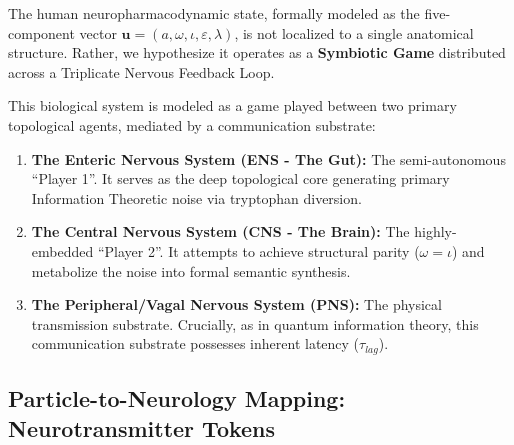 The human neuropharmacodynamic state, formally modeled as the five-component vector $\mathbf{u} = (a, \omega, \iota, \varepsilon, \lambda)$, is not localized to a single anatomical structure. Rather, we hypothesize it operates as a \textbf{Symbiotic Game} distributed across a Triplicate Nervous Feedback Loop.

This biological system is modeled as a game played between two primary topological agents, mediated by a communication substrate:
\begin{enumerate}
    \item \textbf{The Enteric Nervous System (ENS - The Gut):} The semi-autonomous ``Player 1''. It serves as the deep topological core generating primary Information Theoretic noise via tryptophan diversion.
    \item \textbf{The Central Nervous System (CNS - The Brain):} The highly-embedded ``Player 2''. It attempts to achieve structural parity ($\omega = \iota$) and metabolize the noise into formal semantic synthesis.
    \item \textbf{The Peripheral/Vagal Nervous System (PNS):} The physical transmission substrate. Crucially, as in quantum information theory, this communication substrate possesses inherent latency ($\tau_{lag}$).
\end{enumerate}

\subsection{Particle-to-Neurology Mapping: Neurotransmitter Tokens}


